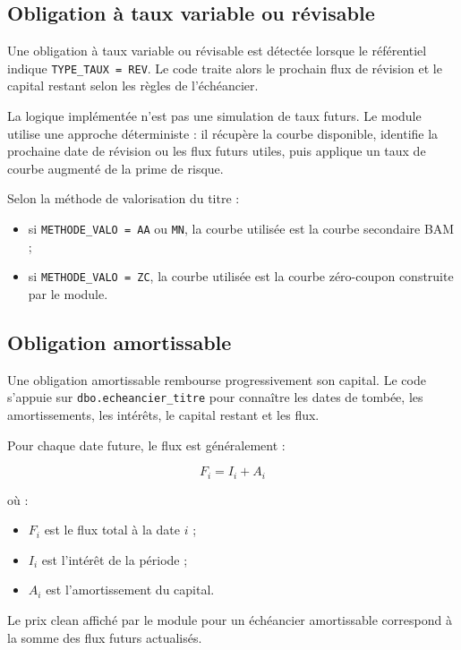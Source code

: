 \documentclass[12pt,a4paper]{article}
\begin{document}
\subsection{Obligation à taux variable ou révisable}

Une obligation à taux variable ou révisable est détectée lorsque le référentiel indique \texttt{TYPE\_TAUX = REV}. Le code traite alors le prochain flux de révision et le capital restant selon les règles de l'échéancier.

La logique implémentée n'est pas une simulation de taux futurs. Le module utilise une approche déterministe : il récupère la courbe disponible, identifie la prochaine date de révision ou les flux futurs utiles, puis applique un taux de courbe augmenté de la prime de risque.

Selon la méthode de valorisation du titre :

\begin{itemize}
    \item si \texttt{METHODE\_VALO = AA} ou \texttt{MN}, la courbe utilisée est la courbe secondaire BAM ;
    \item si \texttt{METHODE\_VALO = ZC}, la courbe utilisée est la courbe zéro-coupon construite par le module.
\end{itemize}

\subsection{Obligation amortissable}

Une obligation amortissable rembourse progressivement son capital. Le code s'appuie sur \texttt{dbo.echeancier\_titre} pour connaître les dates de tombée, les amortissements, les intérêts, le capital restant et les flux.

Pour chaque date future, le flux est généralement :

\[
F_i = I_i + A_i
\]

où :

\begin{itemize}
    \item $F_i$ est le flux total à la date $i$ ;
    \item $I_i$ est l'intérêt de la période ;
    \item $A_i$ est l'amortissement du capital.
\end{itemize}

Le prix clean affiché par le module pour un échéancier amortissable correspond à la somme des flux futurs actualisés.
\end{document}
